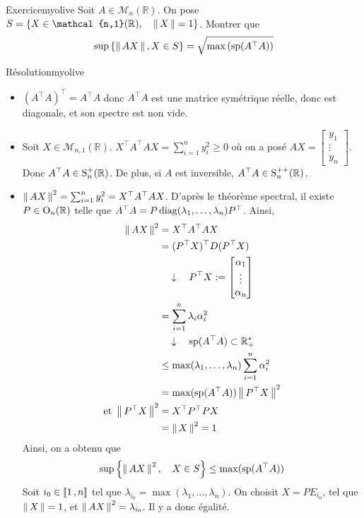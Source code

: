     \begin{omed}{Exercice}{myolive}
        Soit $A \in \mathcal{M}_n(\mathbb{R})$. On pose $S = \left\{X \in \mathcal{n,1}(\mathbb{R}), \quad \norm{X} = 1\right\}$. Montrer que 
        \[ \sup\left\{\norm{AX}, X \in S\right\} = \sqrt{\max\left(\sp(A^{\top} A)\right)} \]
    \end{omed}

    \begin{demo}{Résolution}{myolive}
        \begin{itemize}
            \item $(A^{\top} A)^{\top} = A^{\top} A$ donc $A^{\top} A$ est une matrice symétrique réelle, donc est diagonale, et son spectre est non vide. 
            \item Soit $X \in \mathcal{M}_{n,1}(\mathbb{R})$. $X^{\top} A^{\top} AX = \sum_{i=1}^{n} y_i^2 \geq 0$ où on a posé $AX = \begin{bmatrix}
                y_1 \\
                \vdots \\
                y_n
            \end{bmatrix}$. Donc $A^{\top} A \in \S_n^+(\mathbb{R})$. De plus, si $A$ est inversible, $A^{\top} A \in \S_n^{++}(\mathbb{R})$.
            \item $\norm{AX}^2 = \sum_{i=1}^{n} y_i^2 = X^{\top} A^{\top} A X$. D’après le théorème spectral, il existe $P \in \O_n(\mathbb{R})$ telle que $A^{\top} A = P \diag(\lambda_1,\ldots, \lambda_n) P^{\top}$. Ainsi,
            \begin{align*}
                \norm{AX}^2 
                &= X^{\top} A^{\top} AX \\
                &= (P^{\top} X)^{\top} D (P^{\top} X) \\
                &\quad \downarrow \quad P^{\top} X := \begin{bmatrix}
                    \alpha_1 \\
                    \vdots \\
                    \alpha_n 
                \end{bmatrix} \\
                &= \sum_{i=1}^{n} \lambda_i \alpha_i^2 \\
                &\quad \downarrow \quad \sp(A^{\top} A) \subset \mathbb{R}_+^* \\
                &\leq \max(\lambda_1,\ldots,\lambda_n) \sum_{i=1}^{n} \alpha_i^2 \\
                &= \max(\sp(A^{\top}A)) \norm{P^{\top}X}^2 \\
                \text{et } \norm{P^{\top} X}^2 &= X^{\top} P^{\top} P X \\
                &= \norm{X}^2 = 1
            \end{align*}
            Ainsi, on a obtenu que \[ \sup\left\{\norm{AX}^2, \quad X \in S\right\} \leq \max(\sp(A^{\top}A)) \] 
            Soit $i_0 \in \intervalleEntier{1}{n}$ tel que $\lambda_{i_0} = \max(\lambda_1,\ldots,\lambda_n)$. On choisit $X = P E_{i_0}$, tel que $\norm{X} = 1$, et $\norm{AX}^2 = \lambda_{i_0}$. Il y a donc égalité.
        \end{itemize}
    \end{demo}